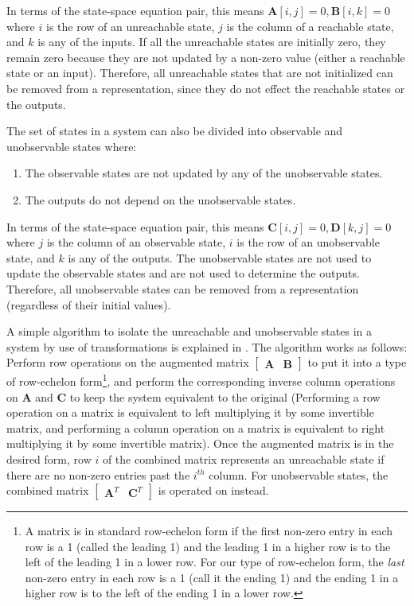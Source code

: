     In terms of the state-space equation pair, this means $\mathbf{A}[i,j] =
0, \mathbf{B}[i,k] = 0$ where $i$ is the row of an unreachable
state, $j$ is the column of a reachable state, and $k$ is any of
the inputs.
    If all the unreachable states are initially zero, they
remain zero because they are not updated by a non-zero value
(either a reachable state or an input). Therefore, all unreachable
states that are not initialized can be removed from a
representation, since they do not effect the reachable states or
the outputs.

    The set of states in a system can also be divided into
observable and unobservable states where:
\begin{enumerate}
\item The observable states are not updated by any of the
unobservable states.

\item The outputs do not depend on the unobservable states.
\end{enumerate}

    In terms of the state-space equation pair, this means $\mathbf{C}[i,j] =
0, \mathbf{D}[k,j] = 0$ where $j$ is the column of an observable
state, $i$ is the row of an unobservable state, and $k$ is any of
the outputs.
    The unobservable states are not used to update the observable
states and are not used to determine the outputs. Therefore, all
unobservable states can be removed from a representation
(regardless of their initial values).

    A simple algorithm to isolate the unreachable and unobservable
states in a system by use of transformations is explained in
\cite{Mayne}. The algorithm works as follows: Perform row
operations on the augmented matrix $\left [ \begin{array} {cc}
\mathbf{A} & \mathbf{B} \end{array} \right ]$ to put it into a
type of row-echelon form\footnote{A matrix is in standard
row-echelon form if the first non-zero entry in each row is a 1
(called the leading 1) and the leading 1 in a higher row is to the
left of the leading 1 in a lower row. For our type of row-echelon
form, the \emph{last} non-zero entry in each row is a 1 (call it
the ending 1) and the ending 1 in a higher row is to the left of
the ending 1 in a lower row.}, and perform the corresponding
inverse column operations on $\mathbf{A}$ and $\mathbf{C}$ to keep
the system equivalent to the original (Performing a row operation
on a matrix is equivalent to left multiplying it by some
invertible matrix, and performing a column operation on a matrix
is equivalent to right multiplying it by some invertible matrix).
Once the augmented matrix is in the desired form, row $i$ of the
combined matrix represents an unreachable state if there are no
non-zero entries past the $i^{th}$ column. For unobservable
states, the combined matrix $\left [ \begin{array} {cc}
\mathbf{A}^T & \mathbf{C}^T
\end{array} \right ]$ is operated on instead.

